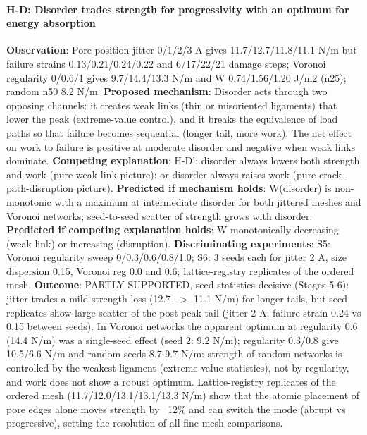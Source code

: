 \paragraph{H-D: Disorder trades strength for progressivity with an optimum for energy absorption} \textbf{Observation}: Pore-position jitter 0/1/2/3 A gives 11.7/12.7/11.8/11.1 N/m but failure strains 0.13/0.21/0.24/0.22 and 6/17/22/21 damage steps; Voronoi regularity 0/0.6/1 gives 9.7/14.4/13.3 N/m and W 0.74/1.56/1.20 J/m2 (n25); random n50 8.2 N/m. \textbf{Proposed mechanism}: Disorder acts through two opposing channels: it creates weak links (thin or misoriented ligaments) that lower the peak (extreme-value control), and it breaks the equivalence of load paths so that failure becomes sequential (longer tail, more work). The net effect on work to failure is positive at moderate disorder and negative when weak links dominate. \textbf{Competing explanation}: H-D': disorder always lowers both strength and work (pure weak-link picture); or disorder always raises work (pure crack-path-disruption picture). \textbf{Predicted if mechanism holds}: W(disorder) is non-monotonic with a maximum at intermediate disorder for both jittered meshes and Voronoi networks; seed-to-seed scatter of strength grows with disorder. \textbf{Predicted if competing explanation holds}: W monotonically decreasing (weak link) or increasing (disruption). \textbf{Discriminating experiments}: S5: Voronoi regularity sweep 0/0.3/0.6/0.8/1.0; S6: 3 seeds each for jitter 2 A, size dispersion 0.15, Voronoi reg 0.0 and 0.6; lattice-registry replicates of the ordered mesh. \textbf{Outcome}: PARTLY SUPPORTED, seed statistics decisive (Stages 5-6): jitter trades a mild strength loss (12.7 -$>$ 11.1 N/m) for longer tails, but seed replicates show large scatter of the post-peak tail (jitter 2 A: failure strain 0.24 vs 0.15 between seeds). In Voronoi networks the apparent optimum at regularity 0.6 (14.4 N/m) was a single-seed effect (seed 2: 9.2 N/m); regularity 0.3/0.8 give 10.5/6.6 N/m and random seeds 8.7-9.7 N/m: strength of random networks is controlled by the weakest ligament (extreme-value statistics), not by regularity, and work does not show a robust optimum. Lattice-registry replicates of the ordered mesh (11.7/12.0/13.1/13.1/13.3 N/m) show that the atomic placement of pore edges alone moves strength by ~12\% and can switch the mode (abrupt vs progressive), setting the resolution of all fine-mesh comparisons.


